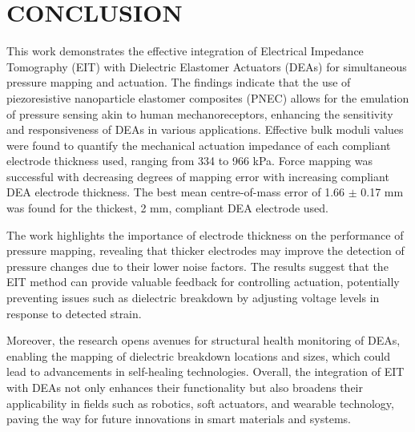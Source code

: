 \section{CONCLUSION}
This work demonstrates the effective integration of Electrical Impedance Tomography (EIT) with Dielectric Elastomer Actuators (DEAs) for simultaneous pressure mapping and actuation. The findings indicate that the use of piezoresistive nanoparticle elastomer composites (PNEC) allows for the emulation of pressure sensing akin to human mechanoreceptors, enhancing the sensitivity and responsiveness of DEAs in various applications. Effective bulk moduli values were found to quantify the mechanical actuation impedance of each compliant electrode thickness used, ranging from 334 to 966 kPa. Force mapping was successful with decreasing degrees of mapping error with increasing compliant DEA electrode thickness. The best mean centre-of-mass error of 1.66 $\pm$ 0.17 mm was found for the thickest, 2 mm, compliant DEA electrode used.

The work highlights the importance of electrode thickness on the performance of pressure mapping, revealing that thicker electrodes may improve the detection of pressure changes due to their lower noise factors. The results suggest that the EIT method can provide valuable feedback for controlling actuation, potentially preventing issues such as dielectric breakdown by adjusting voltage levels in response to detected strain.

Moreover, the research opens avenues for structural health monitoring of DEAs, enabling the mapping of dielectric breakdown locations and sizes, which could lead to advancements in self-healing technologies. Overall, the integration of EIT with DEAs not only enhances their functionality but also broadens their applicability in fields such as robotics, soft actuators, and wearable technology, paving the way for future innovations in smart materials and systems. 